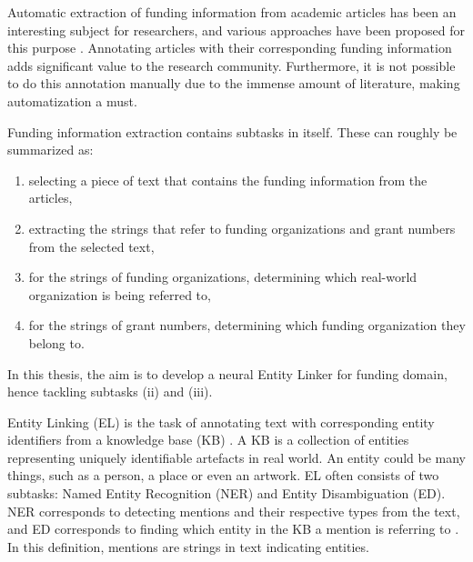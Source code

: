 \documentclass{report}
\theoremstyle{definition}
\theoremstyle{remark}
\begin{document}
Automatic extraction of funding information from academic articles has been an interesting subject for researchers, and various approaches have been proposed for this purpose \cite{ElsPaper,AckExtract,GrantExtractor}. Annotating articles with their corresponding funding information adds significant value to the research community. Furthermore, it is not possible to do this annotation manually due to the immense amount of literature, making automatization a must.

Funding information extraction contains subtasks in itself. These can roughly be summarized as:\vspace{0.2cm}
\renewcommand{\labelenumi}{(\roman{enumi})}
\begin{enumerate}
     \vspace{-0.3cm}\item selecting a piece of text that contains the funding information from the articles,
     \vspace{-0.25cm}\item extracting the strings that refer to funding organizations and grant numbers from the selected text,
     \vspace{-0.3cm}\item for the strings of funding organizations, determining which real-world organization is being referred to,
     \vspace{-0.3cm}\item for the strings of grant numbers, determining which funding organization they belong to.
\end{enumerate}

\vspace{-0.3cm}\noindent In this thesis, the aim is to develop a neural Entity Linker for funding domain, hence tackling subtasks (ii) and (iii). 

Entity Linking (EL) is the task of annotating text with corresponding entity identifiers from a knowledge base (KB) \cite{balog}. A KB is a collection of entities representing uniquely identifiable artefacts in real world. An entity could be many things, such as a person, a place or even an artwork. EL often consists of two subtasks: Named Entity Recognition (NER) and Entity Disambiguation (ED). NER corresponds to detecting mentions and their respective types from the text, and ED corresponds to finding which entity in the KB a mention is referring to \cite{balog}. In this definition, mentions are strings in text indicating entities.
\end{document}
